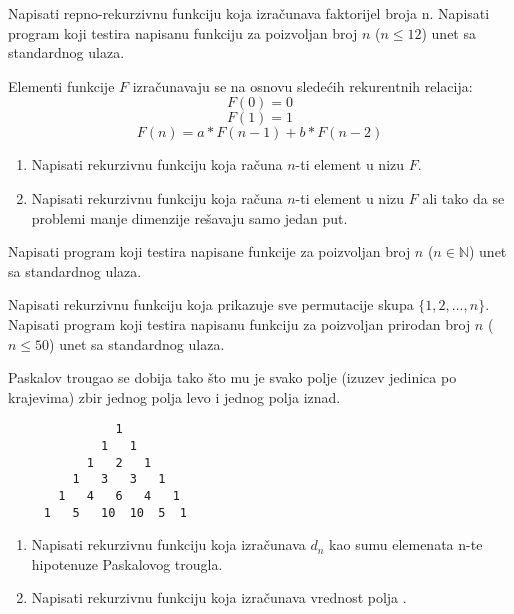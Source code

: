 \begin{Exercise}[label=105]
  Napisati repno-rekurzivnu funkciju koja izračunava faktorijel broja n. Napisati program koji testira napisanu funkciju za poizvoljan broj $n$ ($n \le 12$) unet sa standardnog ulaza.
\end{Exercise}
\begin{Answer}[ref=105]
\end{Answer}


\begin{Exercise}[label=106]
Elementi funkcije $F$ izračunavaju se na osnovu sledećih rekurentnih relacija:
 $$F(0) = 0$$
 $$F(1) = 1$$
 $$F(n) = a* F(n-1) + b*F(n-2)$$
\begin{enumerate}
\item Napisati rekurzivnu funkciju  koja računa $n$-ti element u nizu $F$.
\item Napisati rekurzivnu funkciju  koja računa $n$-ti element u nizu $F$ ali tako da se problemi manje dimenzije rešavaju samo jedan put.
\end{enumerate}
  Napisati program koji testira napisane funkcije za poizvoljan broj $n$ ($n \in \mathbb N$) unet sa standardnog ulaza.
\end{Exercise}
\begin{Answer}[ref=106]
\end{Answer}

\begin{Exercise}[label=107]
Napisati rekurzivnu funkciju koja prikazuje sve permutacije skupa $\{1, 2, ... ,n\}$. Napisati program koji testira napisanu funkciju za poizvoljan prirodan broj $n$ ($n \le 50$) unet sa standardnog ulaza.
\end{Exercise}
\begin{Answer}[ref=107]
\end{Answer}

\begin{Exercise}[label=108]
 Paskalov trougao se dobija tako što mu je svako polje
(izuzev jedinica po krajevima) zbir jednog polja levo i
jednog polja iznad.
\begin{verbatim}
               1
             1   1
           1   2   1
         1   3   3   1
       1   4   6   4   1
     1   5   10  10  5  1
\end{verbatim}
\begin{enumerate}
\item Napisati rekurzivnu funkciju koja izračunava $d_n$ kao sumu elemenata n-te hipotenuze Paskalovog trougla.
\item Napisati rekurzivnu funkciju koja izračunava vrednost polja . 
\end{enumerate}

\end{Exercise}
\begin{Answer}[ref=108]
\end{Answer}

